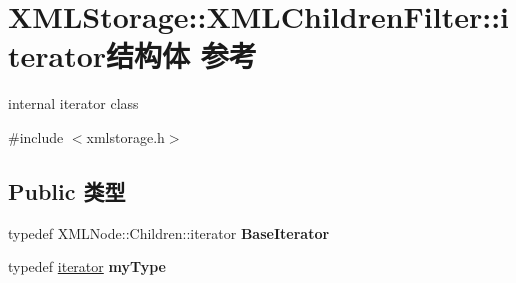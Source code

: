 \hypertarget{struct_x_m_l_storage_1_1_x_m_l_children_filter_1_1iterator}{}\section{X\+M\+L\+Storage\+:\+:X\+M\+L\+Children\+Filter\+:\+:iterator结构体 参考}
\label{struct_x_m_l_storage_1_1_x_m_l_children_filter_1_1iterator}


internal iterator class  




{\ttfamily \#include $<$xmlstorage.\+h$>$}

\subsection*{Public 类型}
\begin{DoxyCompactItemize}
\item 
\mbox{\label{struct_x_m_l_storage_1_1_x_m_l_children_filter_1_1iterator_a321f6cd585d198f8f81531345ac66ec1}} 
typedef X\+M\+L\+Node\+::\+Children\+::iterator {\bfseries Base\+Iterator}
\item 
\mbox{\label{struct_x_m_l_storage_1_1_x_m_l_children_filter_1_1iterator_a44f40bc2ba24ae051671ea00c1ccb4b9}} 
typedef \hyperlink{struct_x_m_l_storage_1_1_x_m_l_children_filter_1_1iterator}{iterator} {\bfseries my\+Type}
\end{DoxyCompactItemize}
